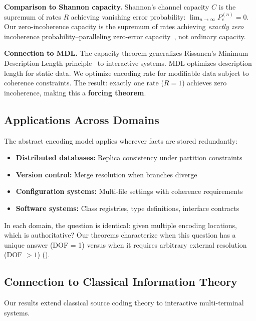 \textbf{Comparison to Shannon capacity.} Shannon's channel capacity $C$ is the supremum of rates $R$ achieving vanishing error probability: $\lim_{n \to \infty} P_e^{(n)} = 0$. Our zero-incoherence capacity is the supremum of rates achieving \emph{exactly zero} incoherence probability--paralleling zero-error capacity~\cite{shannon1956zero}, not ordinary capacity.

\textbf{Connection to MDL.} The capacity theorem generalizes Rissanen's Minimum Description Length principle~\cite{rissanen1978mdl,gruenwald2007mdl} to interactive systems. MDL optimizes description length for static data. We optimize encoding rate for modifiable data subject to coherence constraints. The result: exactly one rate ($R = 1$) achieves zero incoherence, making this a \textbf{forcing theorem}.

\subsection{Applications Across Domains}\label{sec:applications}

The abstract encoding model applies wherever facts are stored redundantly:

\begin{itemize}
\tightlist
\item \textbf{Distributed databases:} Replica consistency under partition constraints~\cite{brewer2000cap}
\item \textbf{Version control:} Merge resolution when branches diverge~\cite{hunt2002vcdiff}
\item \textbf{Configuration systems:} Multi-file settings with coherence requirements~\cite{delaet2010survey}
\item \textbf{Software systems:} Class registries, type definitions, interface contracts~\cite{hunt1999pragmatic}
\end{itemize}

In each domain, the question is identical: given multiple encoding locations, which is authoritative? Our theorems characterize when this question has a unique answer (DOF = 1) versus when it requires arbitrary external resolution (DOF $> 1$) ().

\subsection{Connection to Classical Information Theory}\label{sec:connection-it}

Our results extend classical source coding theory to interactive multi-terminal systems.

